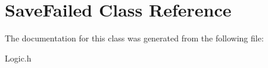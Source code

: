 \hypertarget{class_save_failed}{\section{Save\+Failed Class Reference}
\label{class_save_failed}
}


The documentation for this class was generated from the following file\+:\begin{DoxyCompactItemize}
\item 
Logic.\+h\end{DoxyCompactItemize}
